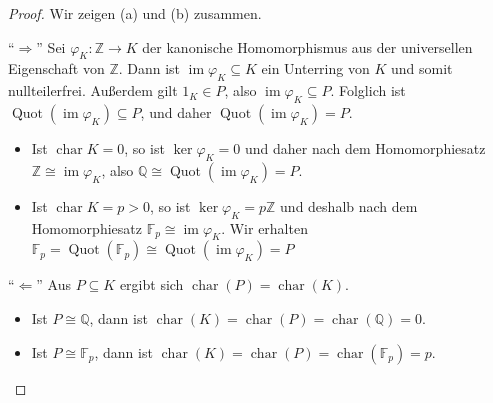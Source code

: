 \documentclass[a4paper, twoside, 11pt, ngerman]{report}
\newcommand{\FF}{\mathds F}
\newcommand{\QQ}{\mathds Q}
\newcommand{\ZZ}{\mathds Z}
\DeclareMathOperator{\charact}{char}
\DeclareMathOperator{\Quot}{Quot}
\theoremstyle{definistyle}
\theoremstyle{remark}
\begin{document}
\begin{proof}
Wir zeigen (a) und (b) zusammen.

"`$\Rightarrow$"' Sei $\varphi_K \colon \ZZ \to K$ der kanonische Homomorphismus aus der universellen Eigenschaft von $\ZZ$. Dann ist $\operatorname{im} \varphi_K \subseteq K$ ein Unterring von $K$ und somit nullteilerfrei. Außerdem gilt $1_K \in P$, also $\operatorname{im} \varphi_K \subseteq P$. Folglich ist $\Quot(\operatorname{im} \varphi_K) \subseteq P$, und daher $\Quot(\operatorname{im} \varphi_K) = P$.
\begin{itemize}
\item Ist $\operatorname{char} K = 0$, so ist $\ker\varphi_K=0$ und daher nach dem Homomorphiesatz $\mathbb{Z} \cong \operatorname{im} \varphi_K$, also $\mathbb{Q} \cong \Quot(\operatorname{im} \varphi_K) = P$.
\item Ist $\operatorname{char} K = p > 0$, so ist $\ker\varphi_K=p\ZZ$ und deshalb nach dem Homomorphiesatz $\mathbb{F}_p \cong \operatorname{im} \varphi_K$. Wir erhalten $\FF_p = \Quot(\FF_p) \cong \Quot(\operatorname{im} \varphi_K) = P$

\end{itemize}

"`$\Leftarrow$"' Aus $P\subseteq K$ ergibt sich $\charact(P)=\charact(K)$.
\begin{itemize}
    \item Ist $P \cong \QQ$, dann ist $\charact(K) = \charact(P) = \charact(\QQ) = 0$.
    \item Ist $P \cong \FF_p$, dann ist $\charact(K) = \charact(P) = \charact(\FF_p) = p$.
\end{itemize}
\end{proof}
\end{document}
